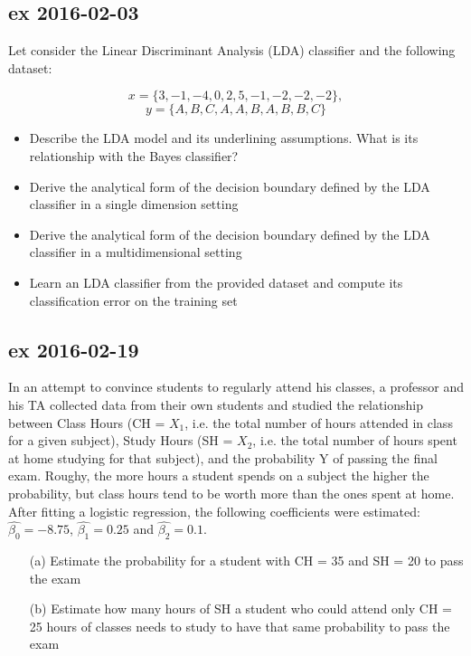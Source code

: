\documentclass[a4paper,12pt,titlepage]{article} %
\begin{document}
\subsection{ex 2016-02-03}
Let consider the Linear Discriminant Analysis (LDA) classifier and the following dataset:

$$ x = \{ 3, -1, -4, 0, 2, 5, -1, -2, -2, -2 \}, $$
$$ y = \{ A, B, C, A, A, B, A, B, B, C \} $$

\begin{itemize}
\item Describe the LDA model and its underlining assumptions. What is its relationship with the Bayes classifier?
\item Derive the analytical form of the decision boundary defined by the LDA classifier in a single dimension setting
\item Derive the analytical form of the decision boundary defined by the LDA classifier in a multidimensional setting
\item Learn an LDA classifier from the provided dataset and compute its classification error on the training set
\end{itemize}

\subsection{ex 2016-02-19}
In an attempt to convince students to regularly attend his classes, a professor and his TA collected data from their own students and studied the relationship between Class Hours (CH = $ X_{1} $, i.e. the total number of hours attended in class for a given subject), Study Hours (SH = $ X_{2} $, i.e. the total number of hours spent at home studying for that subject), and the probability Y of passing the final exam. Roughy, the more hours a student spends on a subject the higher the probability, but class hours tend to be worth more than the ones spent at home. After fitting a logistic regression, the following coefficients were estimated: $ \hat{\beta_{0}} = -8.75 $, $ \hat{\beta_{1}} = 0.25 $ and $ \hat{\beta_{2}} = 0.1 $.

\begin{itemize}
\item[(a)] Estimate the probability for a student with CH = 35 and SH = 20 to pass the exam
\item[(b)] Estimate how many hours of SH a student who could attend only CH = 25 hours of classes needs to study to have that same probability to pass the exam
\end{itemize}
\end{document}
